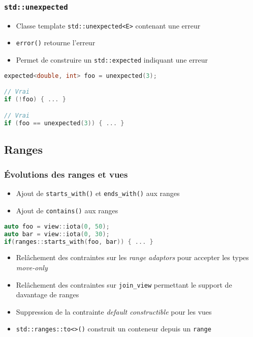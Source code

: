 \documentclass[C++.tex]{subfiles}
\begin{document}
\begin{frame}[fragile]
	\frametitle{\lstinline|std::unexpected|}
	\begin{itemize}
		\item Classe template \lstinline|std::unexpected<E>| contenant une erreur
		\item \lstinline|error()| retourne l'erreur
		\item Permet de construire un \lstinline|std::expected| indiquant une erreur
	\end{itemize}

	\begin{lstlisting}[language=C++]
expected<double, int> foo = unexpected(3);

// Vrai
if (!foo) { ... }

// Vrai
if (foo == unexpected(3)) { ... }\end{lstlisting}
\end{frame}

\subsection*{Ranges}
\begin{frame}[fragile]
	\frametitle{Évolutions des ranges et vues}
	\begin{itemize}
		\item Ajout de \lstinline|starts_with()| et \lstinline|ends_with()| aux ranges
		\item Ajout de \lstinline|contains()| aux ranges
	\end{itemize}

	\begin{lstlisting}[language=C++]
auto foo = view::iota(0, 50);
auto bar = view::iota(0, 30);
if(ranges::starts_with(foo, bar)) { ... }\end{lstlisting}

	\begin{itemize}
		\item Relâchement des contraintes sur les \textit{range adaptors} pour accepter les types \textit{move-only}
		\item Relâchement des contraintes sur \lstinline|join_view| permettant le support de davantage de ranges


		\item Suppression de la contrainte \textit{default constructible} pour les vues
		\item \lstinline|std::ranges::to<>()| construit un conteneur depuis un \lstinline|range|
	\end{itemize}
\end{frame}
\end{document}
